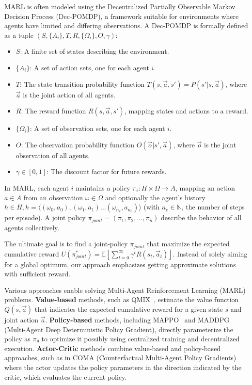 \documentclass[conference]{IEEEtran}
\begin{document}
MARL is often modeled using the Decentralized Partially Observable Markov Decision Process (Dec-POMDP), a framework suitable for environments where agents have limited and differing observations. A Dec-POMDP is formally defined as a tuple $(S, \{A_i\}, T, R, \{\Omega_i\}, O, \gamma)$:

\begin{itemize}
    \item $S$: A finite set of states describing the environment.
    \item $\{A_i\}$: A set of action sets, one for each agent $i$.
    \item $T$: The state transition probability function $T(s, \vec{a}, s') = P(s'|s, \vec{a})$, where $\vec{a}$ is the joint action of all agents.
    \item $R$: The reward function $R(s, \vec{a}, s')$, mapping states and actions to a reward.
    \item $\{\Omega_i\}$: A set of observation sets, one for each agent $i$.
    \item $O$: The observation probability function $O(\vec{o} | s', \vec{a})$, where $\vec{o}$ is the joint observation of all agents.
    \item $\gamma \in [0,1]$: The discount factor for future rewards.
\end{itemize}

In MARL, each agent $i$ maintains a policy $\pi_i: H \times \Omega \rightarrow A$, mapping an action $a \in A$ from an observation $\omega \in \Omega$ and optionally the agent's history $h \in H, h=\langle(\omega_0,a_0),(\omega_1,a_1)\dots(\omega_{n_e},a_{n_e})\rangle$ (with $n_e \in \mathbb{N}$, the number of steps per episode). A joint policy $\pi_{joint} = (\pi_1, \pi_2, \ldots, \pi_n)$ describe the behavior of all agents collectively.

The ultimate goal is to find a joint-policy $\pi_{joint}$ that maximize the expected cumulative reward $U(\pi^*_{joint}) = \mathbb{E}\left[\sum_{t=0}^{\infty} \gamma^t R(s_t, \vec{a}_t)\right]$. Instead of solely aiming for a global optimum, our approach emphasizes getting approximate solutions with sufficient reward.


Various approaches enable solving Multi-Agent Reinforcement Learning (MARL) problems. \textbf{Value-based} methods, such as QMIX~\cite{rashid2018}, estimate the value function $Q(s,\vec{a})$ that indicates the expected cumulative reward for a given state $s$ and joint action $\vec{a}$. \textbf{Policy-based} methods, including MAPPO~\cite{yu2022surprising} and MADDPG~\cite{lowe2017multi} (Multi-Agent Deep Deterministic Policy Gradient), directly parameterize the policy as $\pi_\theta$ to optimize it possibly using centralized training and decentralized execution. \textbf{Actor-Critic} methods combine value-based and policy-based approaches, such as in COMA (Counterfactual Multi-Agent Policy Gradients) where the actor updates the policy parameters in the direction indicated by the critic, which evaluates the current policy.
\end{document}
